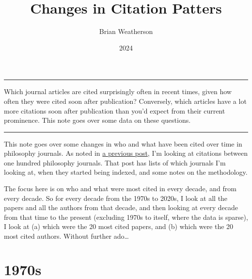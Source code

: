 \documentclass[
  10pt,
  letterpaper,
  DIV=11,
  numbers=noendperiod,
  twoside]{scrartcl}
\title{Changes in Citation Patters}
\author{Brian Weatherson}
\date{2024}
\renewenvironment{abstract}
 {\vspace{-1.25cm}
 \quotation\small\noindent\rule{\linewidth}{.5pt}\par\smallskip
 \noindent }
 {\par\noindent\rule{\linewidth}{.5pt}\endquotation}
\begin{document}
\maketitle
\begin{abstract}
Which journal articles are cited surprisingly often in recent times,
given how often they were cited soon after publication? Conversely,
which articles have a lot more citations soon after publication than
you'd expect from their current prominence. This note goes over some
data on these questions.
\end{abstract}


This note goes over some changes in who and what have been cited over
time in philosophy journals. As noted in
\href{https://brian.weatherson.org/quarto/posts/citations-raw-data/citations.html}{a
previous post}, I'm looking at citations between one hundred philosophy
journals. That post has lists of which journals I'm looking at, when
they started being indexed, and some notes on the methodology.

The focus here is on who and what were most cited in every decade, and
from every decade. So for every decade from the 1970s to 2020s, I look
at all the papers and all the authors from that decade, and then looking
at every decade from that time to the present (excluding 1970s to
itself, where the data is sparse), I look at (a) which were the 20 most
cited papers, and (b) which were the 20 most cited authors. Without
further ado\ldots{}

\section{1970s}\label{s}
\end{document}
